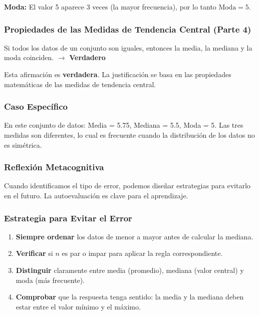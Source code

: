 \documentclass[
]{article}
\providecommand{\tightlist}{%
  \setlength{\itemsep}{0pt}\setlength{\parskip}{0pt}}
\begin{document}
\textbf{Moda:} El valor 5 aparece 3 veces (la mayor frecuencia), por lo
tanto \(\text{Moda} = 5\).

\subsubsection{Propiedades de las Medidas de Tendencia Central (Parte
4)}\label{propiedades-de-las-medidas-de-tendencia-central-parte-4}

Si todos los datos de un conjunto son iguales, entonces la media, la
mediana y la moda coinciden. \(\to\) \textbf{Verdadero}

Esta afirmación es \textbf{verdadera}. La justificación se basa en las
propiedades matemáticas de las medidas de tendencia central.

\subsubsection{Caso Específico}\label{caso-especuxedfico}

En este conjunto de datos: Media = 5.75, Mediana = 5.5, Moda = 5. Las
tres medidas son diferentes, lo cual es frecuente cuando la distribución
de los datos no es simétrica.

\subsubsection{Reflexión
Metacognitiva}\label{reflexiuxf3n-metacognitiva}

Cuando identificamos el tipo de error, podemos diseñar estrategias para
evitarlo en el futuro. La autoevaluación es clave para el aprendizaje.

\subsubsection{Estrategia para Evitar el
Error}\label{estrategia-para-evitar-el-error}

\begin{enumerate}
\def\labelenumi{\arabic{enumi}.}
\tightlist
\item
  \textbf{Siempre ordenar} los datos de menor a mayor antes de calcular
  la mediana.
\item
  \textbf{Verificar} si \(n\) es par o impar para aplicar la regla
  correspondiente.
\item
  \textbf{Distinguir} claramente entre media (promedio), mediana (valor
  central) y moda (más frecuente).
\item
  \textbf{Comprobar} que la respuesta tenga sentido: la media y la
  mediana deben estar entre el valor mínimo y el máximo.
\end{enumerate}
\end{document}
